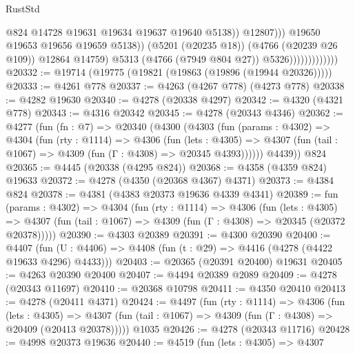 \begin{lexlean}{RustStd}
\begin{coremodule}
{\begin{coremodule}
{{{{{{{{{{{{{{{{{{{{{{{{{{{{{{{{{{{                                              @824
                                              @14728
                                              @19631
                                              @19634
                                              @19637
                                              @19640
                                              @5138))
                                          @12807)))
                                    @19650
                                    @19653
                                    @19656
                                    @19659
                                    @5138))
                                (@5201 (@20235 @18))
                                (@4766 (@20239 @26 @109))
                                @12864
                                @14759)
                              @5313
                              (@4766 (@7949 @804 @27))
                              @5326)))))))))))))
@20332 := @19714 (@19775 (@19821 (@19863 (@19896 (@19944 @20326)))))
@20333 := @4261 @778
@20337 := @4263 (@4267 @778) (@4273 @778)
@20338 := @4282 @19630
@20340 := @4278 (@20338 @4297)
@20342 := @4320 (@4321 @778)
@20343 := @4316 @20342
@20345 := @4278 (@20343 @4346)
@20362 := @4277
    (fun (fn : @7) =>
    @20340
      (@4300
        (@4303
          (fun (params : @4302) =>
          @4304
            (fun (rty : @1114) =>
            @4306
              (fun (lets : @4305) =>
              @4307 (fun (tail : @1067) => @4309 (fun (Γ : @4308) => @20345 @4393))))))
        @4439))
    @824
@20365 := @4445 (@20338 (@4295 @824))
@20368 := @4358 (@4359 @824) @19633
@20372 := @4278 (@4350 (@20368 @4367) @4371)
@20373 := @4384 @824
@20378 := @4381 (@4383 @20373 @19636 @4339 @4341)
@20389 := fun (params : @4302) =>
  @4304
    (fun (rty : @1114) =>
    @4306
      (fun (lets : @4305) =>
      @4307 (fun (tail : @1067) => @4309 (fun (Γ : @4308) => @20345 (@20372 @20378)))))
@20390 := @4303 @20389
@20391 := @4300 @20390
@20400 := @4407
    (fun (U : @4406) => @4408 (fun (t : @29) => @4416 (@4278 (@4422 @19633 @4296) @4433)))
@20403 := @20365 (@20391 @20400) @19631
@20405 := @4263 @20390 @20400
@20407 := @4494 @20389 @2089
@20409 := @4278 (@20343 @11697)
@20410 := @20368 @10798
@20411 := @4350 @20410
@20413 := @4278 (@20411 @4371)
@20424 := @4497
    (fun (rty : @1114) =>
    @4306
      (fun (lets : @4305) =>
      @4307 (fun (tail : @1067) => @4309 (fun (Γ : @4308) => @20409 (@20413 @20378)))))
    @1035
@20426 := @4278 (@20343 @11716)
@20428 := @4998 @20373 @19636
@20440 := @4519
    (fun (lets : @4305) =>
    @4307
}}}}}}}}}}}}}}}}}}}}}}}}}}}}}}}}}}}
\end{coremodule}}
\end{coremodule}
\end{lexlean}
